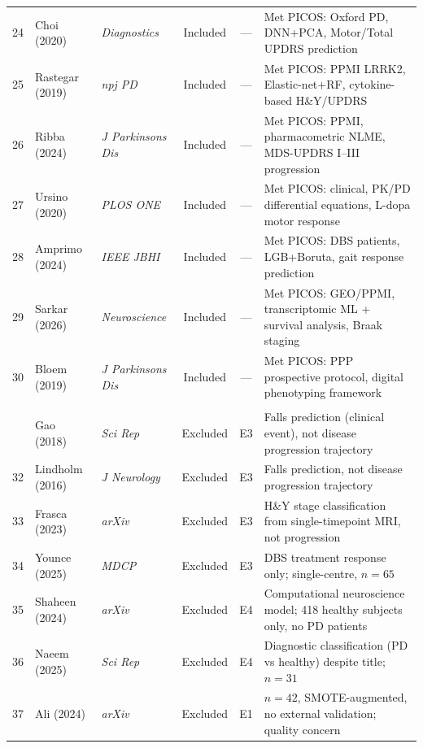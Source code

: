 \documentclass[11pt,a4paper]{article}
\begin{document}
\begin{small}
\begin{longtable}{@{}clp{2.5cm}ccp{5cm}@{}}
24 & Choi (2020)       & \textit{Diagnostics}     & Included & --- & Met PICOS: Oxford PD, DNN+PCA, Motor/Total UPDRS prediction \\
25 & Rastegar (2019)   & \textit{npj PD}          & Included & --- & Met PICOS: PPMI LRRK2, Elastic-net+RF, cytokine-based H\&Y/UPDRS \\
26 & Ribba (2024)      & \textit{J Parkinsons Dis}& Included & --- & Met PICOS: PPMI, pharmacometric NLME, MDS-UPDRS I--III progression \\
27 & Ursino (2020)     & \textit{PLOS ONE}        & Included & --- & Met PICOS: clinical, PK/PD differential equations, L-dopa motor response \\
28 & Amprimo (2024)    & \textit{IEEE JBHI}       & Included & --- & Met PICOS: DBS patients, LGB+Boruta, gait response prediction \\
29 & Sarkar (2026)     & \textit{Neuroscience}    & Included & --- & Met PICOS: GEO/PPMI, transcriptomic ML + survival analysis, Braak staging \\
30 & Bloem (2019)      & \textit{J Parkinsons Dis}& Included & --- & Met PICOS: PPP prospective protocol, digital phenotyping framework \\
\addlinespace
\multicolumn{6}{@{}l}{\textbf{Excluded studies ($n=20$)}} \\
\addlinespace
31 & Gao (2018)        & \textit{Sci Rep}         & Excluded & E3 & Falls prediction (clinical event), not disease progression trajectory \\
32 & Lindholm (2016)   & \textit{J Neurology}     & Excluded & E3 & Falls prediction, not disease progression trajectory \\
33 & Frasca (2023)     & \textit{arXiv}           & Excluded & E3 & H\&Y stage classification from single-timepoint MRI, not progression \\
34 & Younce (2025)     & \textit{MDCP}            & Excluded & E3 & DBS treatment response only; single-centre, $n=65$ \\
35 & Shaheen (2024)    & \textit{arXiv}           & Excluded & E4 & Computational neuroscience model; 418 healthy subjects only, no PD patients \\
36 & Naeem (2025)      & \textit{Sci Rep}         & Excluded & E4 & Diagnostic classification (PD vs healthy) despite title; $n=31$ \\
37 & Ali (2024)        & \textit{arXiv}           & Excluded & E1 & $n=42$, SMOTE-augmented, no external validation; quality concern \\

\end{longtable}
\end{small}
\end{document}
